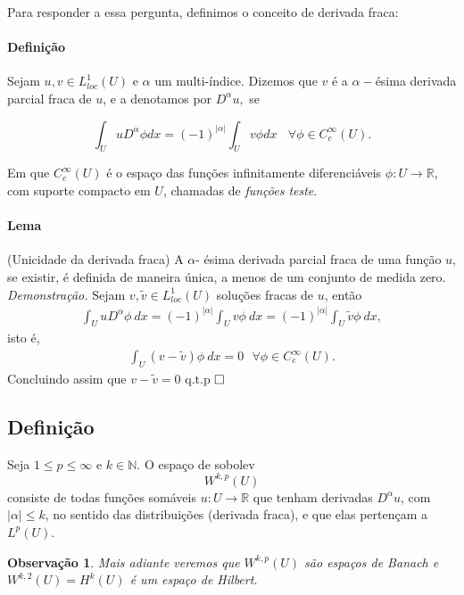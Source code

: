 \documentclass[11pt]{article}
\newcommand{\qed}{$\hfill\square$}
\newcommand{\N}{\mathbb{N}}
\newcommand{\R}{\mathbb{R}}
\newtheorem{remark}{Observação}
\begin{document}
Para responder a essa pergunta, definimos o conceito de derivada fraca:

\paragraph{Definição} Sejam $u,v \in L^1_{loc}(U)$ e $\alpha$ um multi-índice. Dizemos que $v$ é a $\alpha-$ésima derivada parcial fraca de $u$, e a denotamos por $D^{\alpha}u,$ se 

\begin{equation}\label{derivadafraca}
   \int_{U} u D^{\alpha}\phi dx = (-1)^{|\alpha|} \int_{U} v \phi dx  \ \ \ \ \forall \phi \in C^{\infty}_c(U).
   \end{equation}

Em que \( C^{\infty}_c (U) \) é o espaço das funções infinitamente diferenciáveis \( \phi:U\rightarrow \R \), com suporte compacto em \( U \), chamadas de \textit{funções teste}. 

\paragraph{Lema}(Unicidade da derivada fraca) A $\alpha$- ésima derivada parcial fraca de uma função $u$, se existir, é definida de maneira única, a menos de um conjunto de medida zero.
\textit{Demonstração.} Sejam $v, \tilde{v} \in L^1_{loc}(U)$ soluções fracas de $u$, então
 \begin{align*}
     \int_{U}u D^{\alpha}\phi \ dx = (-1)^{|\alpha|} \int _U v \phi \ dx= (-1)^{|\alpha|} \int _U \tilde{v} \phi \ dx,
 \end{align*}
isto é,
\begin{align*}
    \int_{U} (v - \tilde{v}) \phi \ dx = 0 \ \ \ \forall \phi \in C^{\infty}_c(U).
\end{align*}
Concluindo assim que $v-\tilde{v}=0$ q.t.p \qed
\subsection*{Definição}

Seja \( 1\leq p \leq \infty \) e \( k \in \N \). O espaço de sobolev \[ W^{k,p}(U) \] consiste de todas funções somáveis \( u:U\rightarrow\R \) que tenham derivadas \( D^\alpha u \), com \( |\alpha|\leq k \), no sentido das distribuições (derivada fraca), e que elas pertençam a \( L^p(U) \).

\begin{remark}
	Mais adiante veremos que $W^{k,p}(U)$ são espaços de Banach e $ W^{k,2}(U) = H^k(U)$ é um espaço de Hilbert.
\end{remark}
\end{document}
